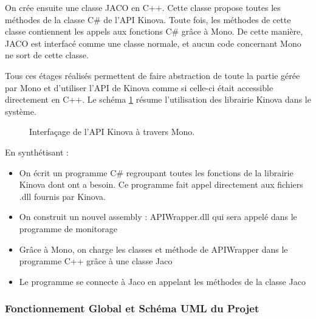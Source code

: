 \documentclass[letterpaper, twoside, 12pt, memoire, creativecommons, hyperref]{thETS}
\begin{document}
On crée ensuite une classe JACO en C++. Cette classe propose toutes les méthodes de la classe C\# de l'API Kinova. Toute fois, les méthodes de cette classe contiennent les appels aux fonctions C\# grâce à Mono. De cette manière, JACO est interfacé comme une classe normale, et aucun code concernant Mono ne sort de cette classe. 

Tous ces étages réalisés permettent de faire abstraction de toute la partie gérée par Mono et d’utiliser l’API de Kinova comme si celle-ci était accessible directement en C++. Le schéma \ref{fig:mono} résume l'utilisation des librairie Kinova dans le système.

\begin{figure}
	\centering
	\caption{Interfaçage de l'API Kinova à travers Mono.}
	\label{fig:mono}
\end{figure}

En synthétisant :
\begin{itemize}
 \item On écrit un programme C\# regroupant toutes les fonctions de la librairie Kinova dont ont a besoin. Ce programme fait appel directement aux fichiers .dll fournis par Kinova. 
 \item On construit un nouvel assembly : APIWrapper.dll qui sera appelé dans le programme de monitorage
 \item Grâce à Mono, on charge les classes et méthode de APIWrapper dans le programme C++ grâce à une classe Jaco
 \item Le programme se connecte à Jaco en appelant les méthodes de la classe Jaco
\end{itemize}

\subsubsection{Fonctionnement Global et Schéma UML du Projet}
\end{document}
